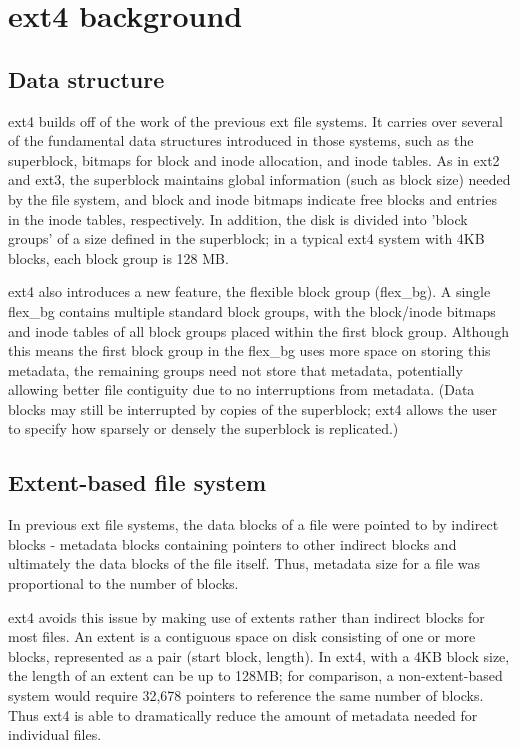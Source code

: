 \documentclass{acm_proc_article-sp}
\begin{document}
\section{ext4 background}
\label{sec:ext4-background}
\subsection{Data structure}
ext4 builds off of the work of the previous 
ext file systems.  It carries over several 
of the fundamental data structures introduced 
in those systems, such as the superblock, bitmaps 
for block and inode allocation, and inode tables.  
As in ext2 and ext3, the superblock maintains global 
information (such as block size) needed by the file 
system, and block and inode bitmaps indicate free 
blocks and entries in the inode tables, respectively.  
In addition, the disk is divided into 'block groups' 
of a size defined in the superblock; in a typical	 
ext4 system with 4KB blocks, each block group is 128 MB.
 
ext4 also introduces a new feature, the flexible 
block group (flex\_bg).  A single flex\_bg contains 
multiple standard block groups, with the block/inode 
bitmaps and inode tables of all block groups placed 
within the first block group.  Although this means 
the first block group in the flex\_bg uses more space 
on storing this metadata, the remaining groups need 
not store that metadata, potentially allowing better 
file contiguity due to no interruptions from metadata.  
(Data blocks may still be interrupted by copies of the 
superblock; ext4 allows the user to specify how 
sparsely or densely the superblock is replicated.)
\cite{ext4kernelnewbies}

\subsection{Extent-based file system}
In previous ext file systems, the data blocks of 
a file were pointed to by indirect blocks - 
metadata blocks containing pointers to other 
indirect blocks and ultimately the data blocks 
of the file itself.  Thus, metadata size for a 
file was proportional to the number of blocks.
 
 
ext4 avoids this issue by making use of extents 
rather than indirect blocks for most files.  An 
extent is a contiguous space on disk consisting 
of one or more blocks, represented as a pair (start 
block, length).  In ext4, with a 4KB block size, 
the length of an extent can be up to 128MB; for 
comparison, a non-extent-based system would require 
32,678 pointers to reference the same number of blocks.  
Thus ext4 is able to dramatically reduce the amount of 
metadata needed for individual files.
\end{document}
